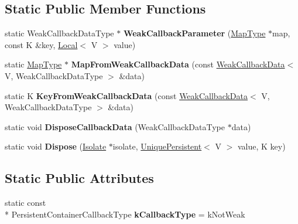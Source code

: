 \subsection*{Static Public Member Functions}
\begin{DoxyCompactItemize}
\item 
\hypertarget{classv8_1_1DefaultPersistentValueMapTraits_a63b6fc80207ce6ac7d1eaa306b68768c}{static Weak\-Callback\-Data\-Type $\ast$ {\bfseries Weak\-Callback\-Parameter} (\hyperlink{classv8_1_1PersistentValueMap}{Map\-Type} $\ast$map, const K \&key, \hyperlink{classv8_1_1Local}{Local}$<$ V $>$ value)}\label{classv8_1_1DefaultPersistentValueMapTraits_a63b6fc80207ce6ac7d1eaa306b68768c}

\item 
\hypertarget{classv8_1_1DefaultPersistentValueMapTraits_a721a7a6624ffe207af1adee6d6be2fe3}{static \hyperlink{classv8_1_1PersistentValueMap}{Map\-Type} $\ast$ {\bfseries Map\-From\-Weak\-Callback\-Data} (const \hyperlink{classv8_1_1WeakCallbackData}{Weak\-Callback\-Data}$<$ V, Weak\-Callback\-Data\-Type $>$ \&data)}\label{classv8_1_1DefaultPersistentValueMapTraits_a721a7a6624ffe207af1adee6d6be2fe3}

\item 
\hypertarget{classv8_1_1DefaultPersistentValueMapTraits_ac85c6254f23d246d78a84721a80babae}{static K {\bfseries Key\-From\-Weak\-Callback\-Data} (const \hyperlink{classv8_1_1WeakCallbackData}{Weak\-Callback\-Data}$<$ V, Weak\-Callback\-Data\-Type $>$ \&data)}\label{classv8_1_1DefaultPersistentValueMapTraits_ac85c6254f23d246d78a84721a80babae}

\item 
\hypertarget{classv8_1_1DefaultPersistentValueMapTraits_a9e5c3a4a054b13f46065adec2c44ddfe}{static void {\bfseries Dispose\-Callback\-Data} (Weak\-Callback\-Data\-Type $\ast$data)}\label{classv8_1_1DefaultPersistentValueMapTraits_a9e5c3a4a054b13f46065adec2c44ddfe}

\item 
\hypertarget{classv8_1_1DefaultPersistentValueMapTraits_ad3c76fc7b1dd8168a69613577e83489d}{static void {\bfseries Dispose} (\hyperlink{classv8_1_1Isolate}{Isolate} $\ast$isolate, \hyperlink{classv8_1_1UniquePersistent}{Unique\-Persistent}$<$ V $>$ value, K key)}\label{classv8_1_1DefaultPersistentValueMapTraits_ad3c76fc7b1dd8168a69613577e83489d}

\end{DoxyCompactItemize}
\subsection*{Static Public Attributes}
\begin{DoxyCompactItemize}
\item 
\hypertarget{classv8_1_1DefaultPersistentValueMapTraits_a1f57d8246e4ace68bc9be1047eb7cc40}{static const \\*
Persistent\-Container\-Callback\-Type {\bfseries k\-Callback\-Type} = k\-Not\-Weak}\label{classv8_1_1DefaultPersistentValueMapTraits_a1f57d8246e4ace68bc9be1047eb7cc40}

\end{DoxyCompactItemize}


